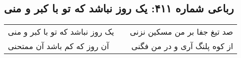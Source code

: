 \begin{center}
\section*{رباعی شماره ۴۱۱: یک روز نباشد که تو با کبر و منی}
\label{sec:sh411}
\begin{longtable}{l p{0.5cm} r}
یک روز نباشد که تو با کبر و منی
&&
صد تیغ جفا بر من مسکین نزنی
\\
آن روز که کم باشد آن ممتحنی
&&
از کوه پلنگ آری و در من فگنی
\\
\end{longtable}
\end{center}
